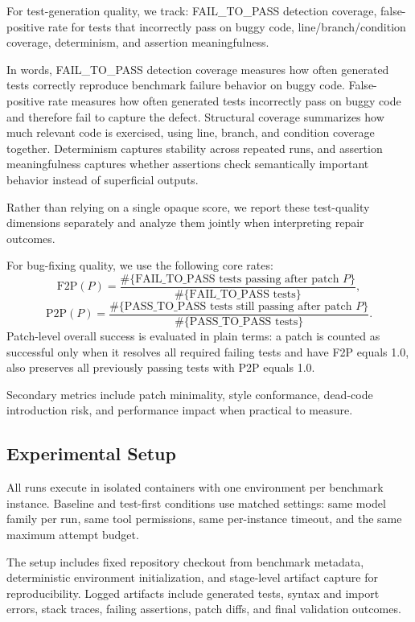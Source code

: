 \documentclass[12pt]{article}
\begin{document}
For test-generation quality, we track: FAIL\_TO\_PASS detection coverage, false-positive rate for tests that incorrectly pass on buggy code, line/branch/condition coverage, determinism, and assertion meaningfulness.

In words, FAIL\_TO\_PASS detection coverage measures how often generated tests correctly reproduce benchmark failure behavior on buggy code. False-positive rate measures how often generated tests incorrectly pass on buggy code and therefore fail to capture the defect. Structural coverage summarizes how much relevant code is exercised, using line, branch, and condition coverage together. Determinism captures stability across repeated runs, and assertion meaningfulness captures whether assertions check semantically important behavior instead of superficial outputs.

Rather than relying on a single opaque score, we report these test-quality dimensions separately and analyze them jointly when interpreting repair outcomes.

For bug-fixing quality, we use the following core rates:
\[
\mathrm{F2P}(P) = \frac{\#\{\text{FAIL\_TO\_PASS tests passing after patch }P\}}{\#\{\text{FAIL\_TO\_PASS tests}\}},
\]
\[
\mathrm{P2P}(P) = \frac{\#\{\text{PASS\_TO\_PASS tests still passing after patch }P\}}{\#\{\text{PASS\_TO\_PASS tests}\}}.
\]
Patch-level overall success is evaluated in plain terms: a patch is counted as successful only when it resolves all required failing tests and have F2P equals 1.0, also preserves all previously passing tests with P2P equals 1.0.

Secondary metrics include patch minimality, style conformance, dead-code introduction risk, and performance impact when practical to measure.
\subsection{Experimental Setup}

All runs execute in isolated containers with one environment per benchmark instance. Baseline and test-first conditions use matched settings: same model family per run, same tool permissions, same per-instance timeout, and the same maximum attempt budget.

The setup includes fixed repository checkout from benchmark metadata, deterministic environment initialization, and stage-level artifact capture for reproducibility. Logged artifacts include generated tests, syntax and import errors, stack traces, failing assertions, patch diffs, and final validation outcomes.
\end{document}
